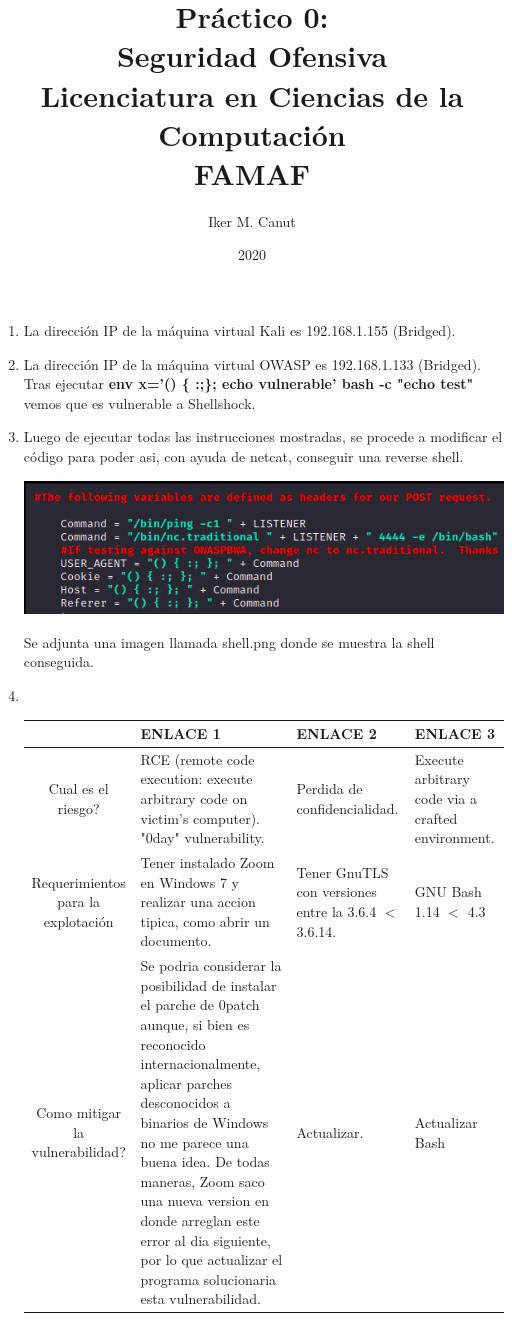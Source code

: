 \documentclass[11pt,a4paper]{article}
\author{Iker M. Canut}
\title{Pr\'actico 0: \\ Seguridad Ofensiva\\Licenciatura en Ciencias de la Computaci\'on\\ FAMAF}
\date{2020}
\begin{document}
\maketitle
\newpage

\begin{enumerate}

\item La direcci\'on IP de la m\'aquina virtual Kali es 192.168.1.155 (Bridged).
\item La direcci\'on IP de la m\'aquina virtual OWASP es 192.168.1.133 (Bridged).\\
Tras ejecutar \textbf{env x='() \{ :;\}; echo vulnerable' bash -c "echo test"} vemos que es vulnerable a Shellshock.
\item Luego de ejecutar todas las instrucciones mostradas, se procede a modificar el c\'odigo para poder asi, con ayuda de netcat, conseguir una reverse shell.
\begin{center}
\includegraphics[scale=.6]{codigo.png}\\
\end{center}
Se adjunta una imagen llamada shell.png donde se muestra la shell conseguida.


\item $\ \ $
\begin{table}[h]
\begin{center}
\begin{tabular}{|S|L|M|M|}
\hline
& ENLACE 1 & ENLACE 2 & ENLACE 3\\
\hline
Cual es el riesgo? & RCE (remote code execution: execute arbitrary code on victim's computer). "0day" vulnerability. & Perdida de confidencialidad. &  Execute arbitrary code via a crafted environment.\\
\hline
Requerimientos para la explotaci\'on & Tener instalado Zoom en Windows 7 y realizar una accion tipica, como abrir un documento. & Tener GnuTLS con versiones entre la 3.6.4 $<$ 3.6.14. & GNU Bash 1.14 $<$ 4.3\\
\hline
Como mitigar la vulnerabilidad? & Se podria considerar la posibilidad de instalar el parche de 0patch aunque, si bien es reconocido internacionalmente, aplicar parches desconocidos a binarios de Windows no me parece una buena idea. De todas maneras, Zoom saco una nueva version en donde arreglan este error al dia siguiente, por lo que actualizar el programa solucionaria esta vulnerabilidad. & Actualizar. & Actualizar Bash\\
\hline
\end{tabular}
\end{center}
\end{table}


\end{enumerate}
\end{document}
